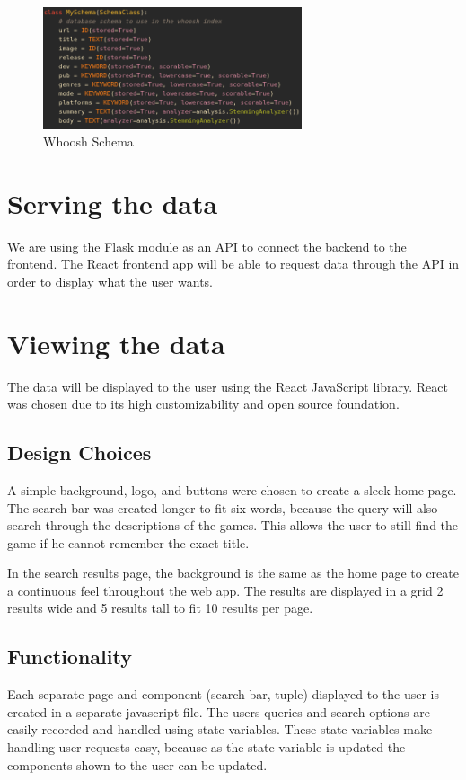 \begin{figure}[h]
\includegraphics[width=3in]{whooshSchema}
\caption{Whoosh Schema}
\label{fig:whooshschema}
\end{figure}

\section{Serving the data}
We are using the Flask module as an API to connect the backend to the frontend. The React frontend app will be able to request data through the API in order to display what the user wants.

\section{Viewing the data}
The data will be displayed to the user using the React JavaScript library. React was chosen due to its high customizability and open source foundation. 

\subsection{Design Choices}
A simple background, logo, and buttons were chosen to create a sleek home page. The search bar was created longer to fit six words, because the query will also search through the descriptions of the games. This allows the user to still find the game if he cannot remember the exact title. 

In the search results page, the background is the same as the home page to create a continuous feel throughout the web app. The results are displayed in a grid 2 results wide and 5 results tall to fit 10 results per page. 

\subsection{Functionality}
Each separate page and component (search bar, tuple) displayed to the user is created in a separate javascript file. The users queries and search options are easily recorded and handled using state variables. These state variables make handling user requests easy, because as the state variable is updated the components shown to the user can be updated. 

